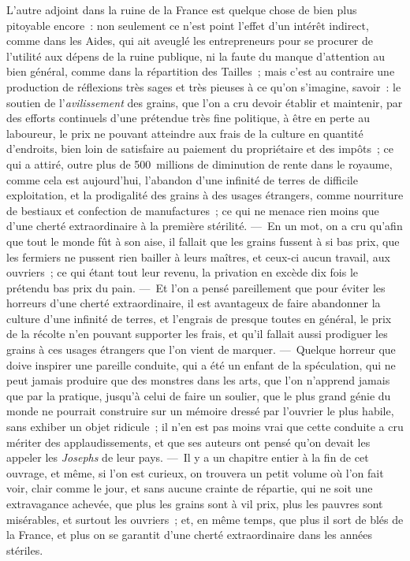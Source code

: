 \documentclass[french,twoside]{book} %
\begin{document}
L’autre adjoint dans la ruine de la France est quelque chose de bien plus pitoyable encore : non seulement ce n’est point l’effet d’un intérêt indirect, comme dans les Aides, qui ait aveuglé les entrepreneurs pour se procurer de l’utilité aux dépens de la ruine publique, ni la faute du manque d’attention au bien général, comme dans la répartition des Tailles ; mais c’est au contraire une production de réflexions très sages et très pieuses à ce qu’on s’imagine, savoir : le soutien de l’{\itshape avilissement} des grains, que l’on a cru devoir établir et maintenir, par des efforts continuels d’une prétendue très fine politique, à être en perte au laboureur, le prix ne pouvant atteindre aux frais de la culture en quantité d’endroits, bien loin de satisfaire au paiement du propriétaire et des impôts ; ce qui a attiré, outre plus de 500 millions de diminution de rente dans le royaume, comme cela est aujourd’hui, l’abandon d’une infinité de terres de difficile exploitation, et la prodigalité des grains à des usages étrangers, comme nourriture de bestiaux et confection de manufactures ; ce qui ne menace rien moins que d’une cherté extraordinaire à la première stérilité. — En un mot, on a cru qu’afin que tout le monde fût à son aise, il fallait que les grains fussent à si bas prix, que les fermiers ne pussent rien bailler à leurs maîtres, et ceux-ci aucun travail, aux ouvriers ; ce qui étant tout leur revenu, la privation en excède dix fois le prétendu bas prix du pain. — Et l’on a pensé pareillement que pour éviter les horreurs d’une cherté extraordinaire, il est avantageux de faire abandonner la culture d’une infinité de terres, et l’engrais de presque toutes en général, le prix de la récolte n’en pouvant supporter les frais, et qu’il fallait aussi prodiguer les grains à ces usages étrangers que l’on vient de marquer. — Quelque horreur que doive inspirer une pareille conduite, qui a été un enfant de la spéculation, qui ne peut jamais produire que des monstres dans les arts, que l’on n’apprend jamais que par la pratique, jusqu’à celui de faire un soulier, que le plus grand génie du monde ne pourrait construire sur un mémoire dressé par l’ouvrier le plus habile, sans exhiber un objet ridicule ; il n’en est pas moins vrai que cette conduite a cru mériter des applaudissements, et que ses auteurs ont pensé qu’on devait les appeler les {\itshape Josephs} de leur pays. — Il y a un chapitre entier à la fin de cet ouvrage, et même, si l’on est curieux, on trouvera un petit volume où l’on fait voir, clair comme le jour, et sans aucune crainte de répartie, qui ne soit une extravagance achevée, que plus les grains sont à vil prix, plus les pauvres sont misérables, et surtout les ouvriers ; et, en même temps, que plus il sort de blés de la France, et plus on se garantit d’une cherté extraordinaire dans les années stériles.
\end{document}
